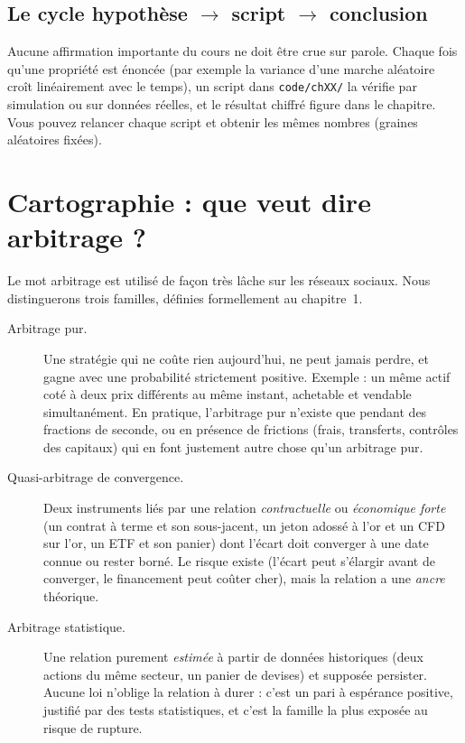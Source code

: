 \documentclass[11pt,a4paper]{article}
\begin{document}
\subsection{Le cycle \og hypothèse $\rightarrow$ script $\rightarrow$ conclusion\fg}
Aucune affirmation importante du cours ne doit être crue sur parole. Chaque fois qu'une propriété est énoncée (par exemple \og la variance d'une marche aléatoire croît linéairement avec le temps\fg), un script dans \texttt{code/chXX/} la vérifie par simulation ou sur données réelles, et le résultat chiffré figure dans le chapitre. Vous pouvez relancer chaque script et obtenir les mêmes nombres (graines aléatoires fixées).

\section{Cartographie : que veut dire \og arbitrage\fg{} ?}

Le mot \og arbitrage\fg{} est utilisé de façon très lâche sur les réseaux sociaux. Nous distinguerons trois familles, définies formellement au chapitre~1.

\begin{description}
\item[Arbitrage pur.] Une stratégie qui ne coûte rien aujourd'hui, ne peut jamais perdre, et gagne avec une probabilité strictement positive. Exemple : un même actif coté à deux prix différents au même instant, achetable et vendable simultanément. En pratique, l'arbitrage pur n'existe que pendant des fractions de seconde, ou en présence de frictions (frais, transferts, contrôles des capitaux) qui en font justement autre chose qu'un arbitrage pur.
\item[Quasi-arbitrage de convergence.] Deux instruments liés par une relation \emph{contractuelle} ou \emph{économique forte} (un contrat à terme et son sous-jacent, un jeton adossé à l'or et un CFD sur l'or, un ETF et son panier) dont l'écart doit converger à une date connue ou rester borné. Le risque existe (l'écart peut s'élargir avant de converger, le financement peut coûter cher), mais la relation a une \emph{ancre} théorique.
\item[Arbitrage statistique.] Une relation purement \emph{estimée} à partir de données historiques (deux actions du même secteur, un panier de devises) et supposée persister. Aucune loi n'oblige la relation à durer : c'est un pari à espérance positive, justifié par des tests statistiques, et c'est la famille la plus exposée au risque de rupture.
\end{description}
\end{document}
